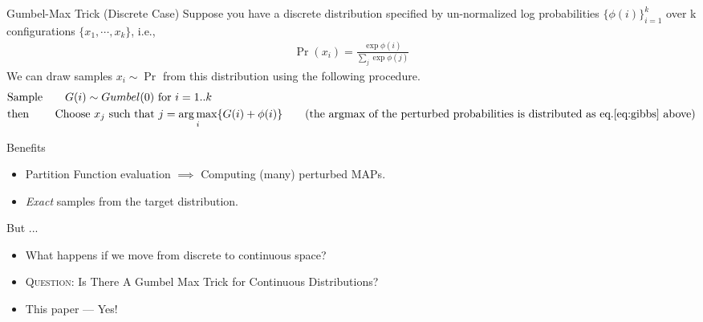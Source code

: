 \begin{frame}{Gumbel-Max Trick (Discrete Case)}
  Suppose you have a discrete distribution specified by un-normalized log probabilities $\{\phi(i)\}_{i=1}^{k}$ over k configurations $\{x_1,\cdots,x_k\}$, i.e.,
  \begin{align}
    \Pr(x_i) = \frac{\exp\phi(i)}{\sum_j\exp\phi(j)} \label{eq:gibbs}
  \end{align}
  We can draw samples $x_i \sim \Pr$ from this distribution using the following procedure.
  \begin{align*}
    & \text{Sample} \qquad G(i) \sim Gumbel(0) \text{ for } i=1..k\\
    & \text{then} \qquad \text{ Choose } x_j \text{ such that } j= \argmax_i \{G(i) +\phi(i)\} \tag{the argmax of the perturbed probabilities is distributed as eq.\ref{eq:gibbs} above}
  \end{align*}

\end{frame}

\begin{frame}{Benefits}
  \begin{itemize}[<+->]
  \item Partition Function evaluation $\implies$ Computing (many) perturbed MAPs. %
  \item \emph{Exact} samples from the target distribution. %
  \end{itemize}
  \pause
  But ...
  \begin{itemize}[<+->]
  \item What happens if we move from discrete to continuous space?
  \item \textsc{Question:} Is There A Gumbel Max Trick for Continuous Distributions?
  \item {\color{red} This paper --- Yes!}
  \end{itemize}
\end{frame}


